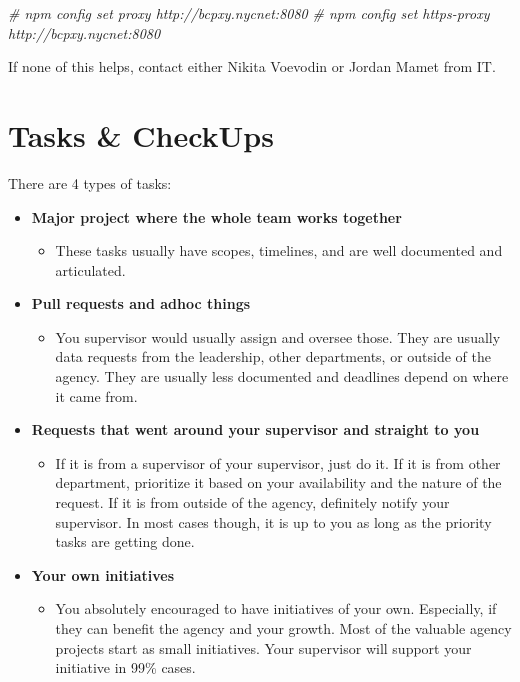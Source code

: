 \documentclass[
]{book}
\newenvironment{Shaded}{\begin{snugshade}}{\end{snugshade}}
\newcommand{\CommentTok}[1]{\textcolor[rgb]{0.56,0.35,0.01}{\textit{#1}}}
\providecommand{\tightlist}{%
  \setlength{\itemsep}{0pt}\setlength{\parskip}{0pt}}
\begin{document}
\begin{Shaded}
\begin{Highlighting}[]
\CommentTok{\# npm config set proxy http://bcpxy.nycnet:8080}
\CommentTok{\# npm config set https{-}proxy http://bcpxy.nycnet:8080}
\end{Highlighting}
\end{Shaded}

If none of this helps, contact either Nikita Voevodin or Jordan Mamet from IT.

\hypertarget{tasks-checkups}{%
\chapter{Tasks \& CheckUps}\label{tasks-checkups}}

There are 4 types of tasks:

\begin{itemize}
\item
  \textbf{Major project where the whole team works together}

  \begin{itemize}
  \tightlist
  \item
    These tasks usually have scopes, timelines, and are well documented and articulated.
  \end{itemize}
\item
  \textbf{Pull requests and adhoc things}

  \begin{itemize}
  \tightlist
  \item
    You supervisor would usually assign and oversee those. They are usually data requests from the leadership, other departments, or outside of the agency. They are usually less documented and deadlines depend on where it came from.
  \end{itemize}
\item
  \textbf{Requests that went around your supervisor and straight to you}

  \begin{itemize}
  \tightlist
  \item
    If it is from a supervisor of your supervisor, just do it. If it is from other department, prioritize it based on your availability and the nature of the request. If it is from outside of the agency, definitely notify your supervisor. In most cases though, it is up to you as long as the priority tasks are getting done.
  \end{itemize}
\item
  \textbf{Your own initiatives}

  \begin{itemize}
  \tightlist
  \item
    You absolutely encouraged to have initiatives of your own. Especially, if they can benefit the agency and your growth. Most of the valuable agency projects start as small initiatives. Your supervisor will support your initiative in 99\% cases.
  \end{itemize}
\end{itemize}
\end{document}
